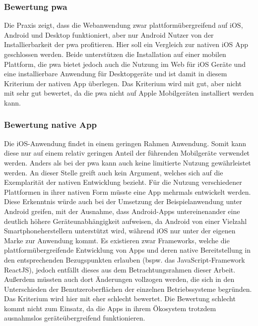 \subsubsection{Bewertung \ac{pwa}}
Die Praxis zeigt, dass die Webanwendung zwar plattformübergreifend auf iOS, Android und Desktop funktioniert, aber nur Android Nutzer von der Installierbarkeit der \ac{pwa} profitieren.
Hier soll ein Vergleich zur nativen iOS App geschlossen werden. Beide unterstützen die Installation auf einer mobilen Plattform, die \ac{pwa} bietet jedoch auch die Nutzung im Web für iOS Geräte und eine installierbare Anwendung für Desktopgeräte und ist damit in diesem Kriterium der nativen App überlegen. Das Kriterium wird mit gut, aber nicht mit sehr gut bewertet, da die \ac{pwa} nicht auf Apple Mobilgeräten installiert werden kann.

\subsubsection{Bewertung native App}
Die iOS-Anwendung findet in einem geringen Rahmen Anwendung. Somit kann diese nur auf einem relativ geringen Anteil der führenden Mobilgeräte verwendet werden. Anders als bei der \ac{pwa} kann auch keine limitierte Nutzung gewährleistet werden. An dieser Stelle greift auch kein Argument, welches sich auf die Exemplarität der nativen Entwicklung bezieht. Für die Nutzung verschiedener Plattformen in ihrer nativen Form müsste eine App mehrmals entwickelt werden. Diese Erkenntnis würde auch bei der Umsetzung der Beispielanwendung unter Android greifen, mit der Ausnahme, dass Android-Apps untereinenander eine deutlich höhere Geräteunabhängigkeit aufweisen, da Android von einer Vielzahl Smartphoneherstellern unterstützt wird, während iOS nur unter der eigenen Marke zur Anwendung kommt. Es existieren zwar Frameworks, welche die plattformübergreifende Entwicklung von Apps und deren native Bereitstellung in den entsprechenden Bezugspunkten erlauben (bspw. das JavaScript-Framework ReactJS), jedoch entfällt dieses aus dem Betrachtungsrahmen dieser Arbeit. Außerdem müssten auch dort Änderungen vollzogen werden, die sich in den Unterschieden der Benutzeroberflächen der einzelnen Betriebssysteme begründen. Das Kriterium wird hier mit eher schlecht bewertet. Die Bewertung schlecht kommt nicht zum Einsatz, da die Apps in ihrem Ökosystem trotzdem ausnahmslos geräteübergreifend funktionieren.
